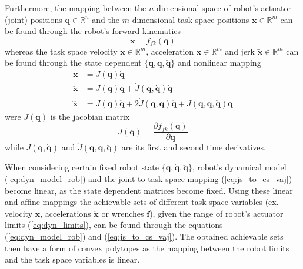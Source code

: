 Furthermore, the mapping between the $n$ dimensional space of robot's actuator (joint) positions $\bm{q}\in \mathbb{R}^n$ and the $m$ dimensional task space positions $\bm{x} \in \mathbb{R}^m$ can be found through the robot's forward kinematics 
\begin{equation}
    \bm{x} = f_{fk} (\bm{q})
\end{equation}
whereas the task space velocity $\dot{\bm{x}}\in \mathbb{R}^m$, acceleration $\ddot{\bm{x}}\in \mathbb{R}^m$ and jerk $\dddot{\bm{x}}\in \mathbb{R}^m$ can be found through the state dependent  $\{\bm{q},\dot{\bm{q}},\ddot{\bm{q}}\}$  and nonlinear mapping
\begin{subequations}
\begin{align}
\dot{\bm{x}}&= {J}(\bm{q})\dot{\bm{q}} \label{eq:js_to_cs_vaj:vel}\\
\ddot{\bm{x}}&= J(\bm{q})\ddot{\bm{q}} + \dot{J}(\bm{q},\dot{\bm{q}})\dot{\bm{q}} \label{eq:js_to_cs_vaj:accel}\\
\dddot{\bm{x}}&= J(\bm{q})\dddot{\bm{q}} + 2\dot{J}(\bm{q},\dot{\bm{q}})\ddot{\bm{q}} + \ddot{J}(\bm{q},\dot{\bm{q}},\ddot{\bm{q}})\dot{\bm{q}}\label{eq:js_to_cs_vaj:jerk}
 \end{align} \label{eq:js_to_cs_vaj}
\end{subequations}
were $J(\bm{q}) $ is the jacobian matrix
\begin{equation}
    J(\bm{q}) = \frac{\partial f_{fk} (\bm{q})}{\partial \bm{q}}
\end{equation}
while $\dot{J}(\bm{q},\dot{\bm{q}})$ and $\ddot{J}(\bm{q},\dot{\bm{q}},\ddot{\bm{q}})$ are its first and second time derivatives.


When considering certain fixed robot state $\{\bm{q},\dot{\bm{q}},\ddot{\bm{q}}\}$, robot's dynamical model (\ref{eq:dyn_model_rob}) and the joint to task space mapping (\ref{eq:js_to_cs_vaj}) become linear, as the state dependent matrices become fixed. Using these linear and affine mappings the achievable sets of different task space variables (ex. velocity $\dot{\bm{x}}$, accelerations $\ddot{\bm{x}}$ or wrenches $\bm{f}$), given the range of robot's actuator limits (\ref{eq:dyn_limits}), can be found through the equations (\ref{eq:dyn_model_rob}) and (\ref{eq:js_to_cs_vaj}). The obtained achievable sets then have a form of convex polytopes as the mapping between the robot limits and the task space variables is linear.

